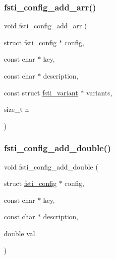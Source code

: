 \subsubsection{\texorpdfstring{fsti\+\_\+config\+\_\+add\+\_\+arr()}{fsti\_config\_add\_arr()}}
{\footnotesize\ttfamily void fsti\+\_\+config\+\_\+add\+\_\+arr (\begin{DoxyParamCaption}\item[{struct \mbox{\hyperlink{structfsti__config}{fsti\+\_\+config}} $\ast$}]{config,  }\item[{const char $\ast$}]{key,  }\item[{const char $\ast$}]{description,  }\item[{const struct \mbox{\hyperlink{structfsti__variant}{fsti\+\_\+variant}} $\ast$}]{variants,  }\item[{size\+\_\+t}]{n }\end{DoxyParamCaption})}

\mbox{\label{fsti-config_8c_ac687fc8ca6887aae337ce8ef4188f089}} 
\subsubsection{\texorpdfstring{fsti\+\_\+config\+\_\+add\+\_\+double()}{fsti\_config\_add\_double()}}
{\footnotesize\ttfamily void fsti\+\_\+config\+\_\+add\+\_\+double (\begin{DoxyParamCaption}\item[{struct \mbox{\hyperlink{structfsti__config}{fsti\+\_\+config}} $\ast$}]{config,  }\item[{const char $\ast$}]{key,  }\item[{const char $\ast$}]{description,  }\item[{double}]{val }\end{DoxyParamCaption})}

\mbox{\label{fsti-config_8c_aeeb0d90b0edb706662e123f6747b2a3c}} 
